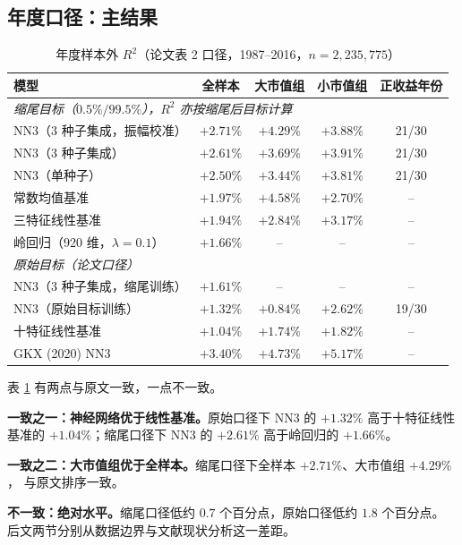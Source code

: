 \documentclass[11pt,a4paper,fontset=windows]{ctexart}
\begin{document}
\subsection{年度口径：主结果}

\begin{table}[htbp]
\centering
\caption{年度样本外 $R^2$（论文表 2 口径，1987--2016，$n=2{,}235{,}775$）}
\label{tab:annual}
\small
\begin{tabular}{lcccc}
\toprule
模型 & 全样本 & 大市值组 & 小市值组 & 正收益年份 \\
\midrule
\multicolumn{5}{l}{\emph{缩尾目标（$0.5\%/99.5\%$），$R^2$ 亦按缩尾后目标计算}} \\
NN3（3 种子集成，振幅校准） & $\mathbf{+2.71\%}$ & $+4.29\%$ & $+3.88\%$ & 21/30 \\
NN3（3 种子集成） & $+2.61\%$ & $+3.69\%$ & $+3.91\%$ & 21/30 \\
NN3（单种子） & $+2.50\%$ & $+3.44\%$ & $+3.81\%$ & 21/30 \\
常数均值基准 & $+1.97\%$ & $+4.58\%$ & $+2.70\%$ & -- \\
三特征线性基准 & $+1.94\%$ & $+2.84\%$ & $+3.17\%$ & -- \\
岭回归（920 维，$\lambda=0.1$） & $+1.66\%$ & -- & -- & -- \\
\midrule
\multicolumn{5}{l}{\emph{原始目标（论文口径）}} \\
NN3（3 种子集成，缩尾训练） & $\mathbf{+1.61\%}$ & -- & -- & -- \\
NN3（原始目标训练） & $+1.32\%$ & $+0.84\%$ & $+2.62\%$ & 19/30 \\
十特征线性基准 & $+1.04\%$ & $+1.74\%$ & $+1.82\%$ & -- \\
\midrule
GKX (2020) NN3 & $+3.40\%$ & $+4.73\%$ & $+5.17\%$ & -- \\
\bottomrule
\end{tabular}
\end{table}

表 \ref{tab:annual} 有两点与原文一致，一点不一致。

\textbf{一致之一：神经网络优于线性基准。}原始口径下 NN3 的 $+1.32\%$ 高于十特征线性基准的
$+1.04\%$；缩尾口径下 NN3 的 $+2.61\%$ 高于岭回归的 $+1.66\%$。

\textbf{一致之二：大市值组优于全样本。}缩尾口径下全样本 $+2.71\%$、大市值组 $+4.29\%$，
与原文排序一致。

\textbf{不一致：绝对水平。}缩尾口径低约 $0.7$ 个百分点，原始口径低约 $1.8$ 个百分点。
后文两节分别从数据边界与文献现状分析这一差距。
\end{document}
